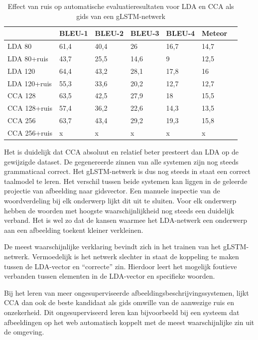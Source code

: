 \begin{table}
	\centering
	\begin{tabular}{lllllll}
		~                  & BLEU-1 & BLEU-2 & BLEU-3 & BLEU-4 & Meteor \\ \hline
		LDA 80        & 61,4   & 40,4 			& 26   & 16,7  & 14,7 \\
		LDA 80+ruis & 43,7  &25,5    &14,6   & 9   & 12,5 \\ \hline
		LDA 120   & 64,4   & 43,2   & 28,1   & 17,8 & 16 \\
		LDA 120+ruis   & 55,3   & 33,6   & 20,2   & 12,7 & 12,7 \\ \hline
		CCA 128   & 63,5   & 42,5   & 27,9   & 18 & 15,5 \\
		CCA 128+ruis   & 57,4   & 36,2   & 22,6   & 14,3 & 13,5 \\ \hline
		CCA 256   & 63,7   & 43,4   & 29,2   & 19,3 & 15,8 \\
		CCA 256+ruis   & x  & x   & x   & x & x \\ \hline			
	\end{tabular}
	\caption{Effect van ruis op automatische evaluatieresultaten voor LDA en CCA als gids van een gLSTM-netwerk}
	\label{table:ruis}
\end{table}

Het is duidelijk dat CCA absoluut en relatief beter presteert dan LDA op de gewijzigde dataset.
De gegenereerde zinnen van alle systemen zijn nog steeds grammaticaal correct.
Het gLSTM-netwerk is dus nog steeds in staat een correct taalmodel te leren.
Het verschil tussen beide systemen kan liggen in de geleerde projectie van afbeelding naar gidsvector.
Een manuele inspectie van de woordverdeling bij elk onderwerp lijkt dit uit te sluiten.
Voor elk onderwerp hebben de woorden met hoogste waarschijnlijkheid nog steeds een duidelijk verband.
Het is wel zo dat de kansen waarmee het LDA-netwerk een onderwerp aan een afbeelding toekent kleiner verkleinen.

De meest waarschijnlijke verklaring bevindt zich in het trainen van het gLSTM-netwerk.
Vermoedelijk is het netwerk slechter in staat de koppeling te maken tussen de LDA-vector en ``correcte'' zin. 
Hierdoor leert het mogelijk foutieve verbanden tussen elementen in de LDA-vector en specifieke woorden.
	
Bij het leren van meer ongesuperviseerde afbeeldingsbeschrijvingssystemen, lijkt CCA dan ook de beste kandidaat als gids omwille van de aanwezige ruis en onzekerheid.
Dit ongesuperviseerd leren kan bijvoorbeeld bij een systeem dat afbeeldingen op het web automatisch koppelt met de meest waarschijnlijke zin uit de omgeving.

